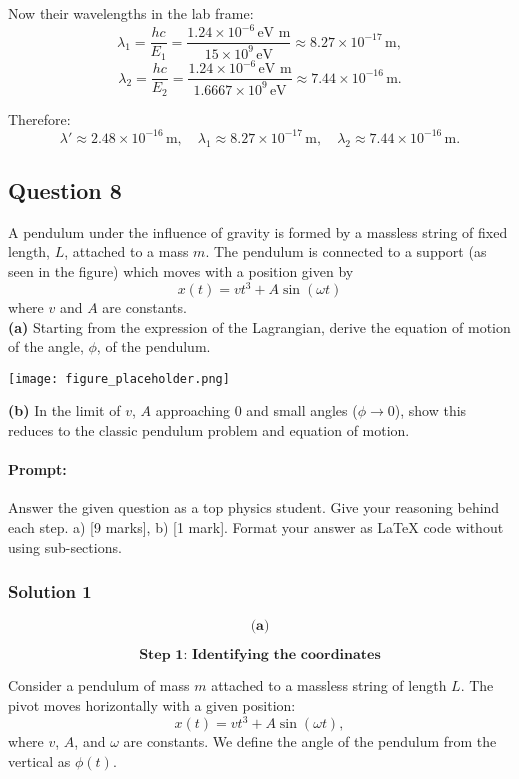 \documentclass{article}
\begin{document}
Now their wavelengths in the lab frame:
\[
\lambda_1 = \frac{h c}{E_1} = \frac{1.24 \times 10^{-6}\,\text{eV m}}{15 \times 10^9\,\text{eV}} \approx 8.27 \times 10^{-17}\,\text{m},
\]
\[
\lambda_2 = \frac{h c}{E_2} = \frac{1.24 \times 10^{-6}\,\text{eV m}}{1.6667 \times 10^9\,\text{eV}} \approx 7.44 \times 10^{-16}\,\text{m}.
\]

Therefore:
\[
\lambda' \approx 2.48 \times 10^{-16}\,\text{m}, \quad \lambda_1 \approx 8.27 \times 10^{-17}\,\text{m}, \quad \lambda_2 \approx 7.44 \times 10^{-16}\,\text{m}.
\]

\subsection{Question 8}

A pendulum under the influence of gravity is formed by a massless string of fixed length, $L$, attached to a mass $m$. The pendulum is connected to a support (as seen in the figure) which moves with a position given by
\[
x(t) = vt^3 + A\sin(\omega t)
\]
where $v$ and $A$ are constants. \\

\textbf{(a)} Starting from the expression of the Lagrangian, derive the equation of motion of the angle, $\phi$, of the pendulum.

\begin{center}
\texttt{[image: figure\_placeholder.png]}
\end{center}

\textbf{(b)} In the limit of $v$, $A$ approaching 0 and small angles ($\phi \to 0$), show this reduces to the classic pendulum problem and equation of motion.

\paragraph{Prompt: \\} 
Answer the given question as a top physics student. Give your reasoning behind each step. a) [9 marks], b) [1 mark].
Format your answer as LaTeX code without using sub-sections.

\subsubsection{Solution 1}
\[
\textbf{(a)}
\]

\[
\textbf{Step 1: Identifying the coordinates}
\]

Consider a pendulum of mass \( m \) attached to a massless string of length \( L \). The pivot moves horizontally with a given position:
\[
x(t) = vt^3 + A\sin(\omega t),
\]
where \( v \), \( A \), and \(\omega\) are constants. We define the angle of the pendulum from the vertical as \(\phi(t)\).
\end{document}
